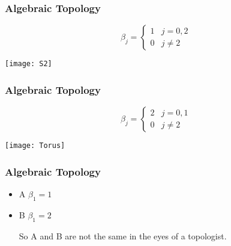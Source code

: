 \begin{frame}
\frametitle{Algebraic Topology}
\[ \beta_j = \begin{cases} 
      1 & j = 0, 2 \\
      0 & j \neq 2 
   \end{cases}
\]
\begin{center}
\texttt{[image: S2]}
\end{center}
\end{frame}

\begin{frame}
\frametitle{Algebraic Topology}
\[ \beta_j = \begin{cases} 
      2 & j = 0, 1 \\
      0 & j \neq 2 
   \end{cases}
\]
\begin{center}
\texttt{[image: Torus]}
\end{center}
\end{frame}

\begin{frame}
\frametitle{Algebraic Topology}
\begin{itemize}
\item<1-> {\fontsize{70}{80}\selectfont \textsf{  A  }} $\beta_1 = 1$
\item<2-> {\fontsize{70}{80}\selectfont \textsf{  B  }} $\beta_1 = 2$

So A and B are not the same in the eyes of a topologist.
\end{itemize}

\end{frame}